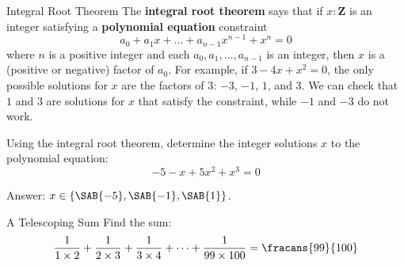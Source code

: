 \documentclass[12pt,letterpaper]{article}
\begin{document}
\begin{problem}{Integral Root Theorem}
  The \textbf{integral root theorem} says that if \(x: \mathbf{Z}\) is an integer satisfying
  a \textbf{polynomial equation} constraint \[
    a_0 + a_1 x + \dots + a_{n-1} x^{n-1} + x^n = 0
  \] where \(n\) is a positive integer and each \(a_0, a_1, \dots, a_{n-1}\) is an integer,
  then \(x\) is a (positive or negative) factor of \(a_0\).  For example, if \(3 - 4x + x^2 =
  0\), the only possible solutions for \(x\) are the factors of \(3\): \(-3\), \(-1\),
  \(1\), and \(3\). We can check that \(1\) and \(3\) are solutions for \(x\) that satisfy
  the constraint, while \(-1\) and \(-3\) do not work.

  Using the integral root theorem, determine the integer solutions \(x\) to the polynomial
  equation: \[
    -5 - x + 5x^2 + x^3 = 0
  \]

  Answer: \(x \in \{\SAB{-5}, \SAB{-1}, \SAB{1}\}\).
\end{problem}

\begin{problem}{A Telescoping Sum}
 Find the sum:
 \[
  \frac{1}{1 \times 2} + \frac{1}{2 \times 3} + \frac{1}{3 \times 4}
  + \dots + \frac{1}{99 \times 100} = \fracans{99}{100}
 \]
\end{problem}
\end{document}
